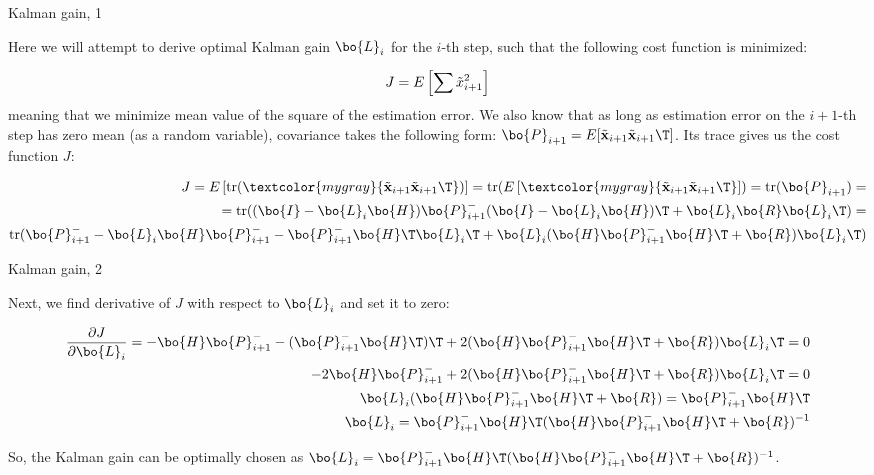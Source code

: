 \documentclass{beamer}
\newcommand{\btil}[1] {\Tilde{\mathbf{#1}}}
\begin{document}
\begin{frame}{Kalman gain, 1}
	\begin{flushleft}
		
		Here we will attempt to derive optimal Kalman gain $\bo{L}_i$ for the $i$-th step, such that the following cost function is minimized:
		
		\begin{equation}
			J = E \left[ \sum \Tilde x_{i+1}^2  \right]
		\end{equation}
		meaning that we minimize mean value of the square of the estimation error. We also know that as long as estimation error on the $i+1$-th step has zero mean (as a random variable), covariance takes the following form: $\bo{P}_{i+1} = E [ \btil{x}_{i+1} \btil{x}_{i+1}\T ]$. Its trace gives us the cost function $J$:
		
		
		
		\begin{align*}
			J = E \left[ \text{tr}(\textcolor{mygray}{
				\btil{x}_{i+1} \btil{x}_{i+1}\T})  \right] =
			\text{tr} (E \left[ \textcolor{mygray}{
				\btil{x}_{i+1} \btil{x}_{i+1}\T}  \right]) = 
				\text{tr} (\bo{P}_{i+1} ) =
				\\
			= \text{tr}(
			(\bo{I} - \bo{L}_i \bo{H}) \bo{P}_{i+1}^- (\bo{I} - \bo{L}_i \bo{H})\T +\bo{L}_i\bo{R}\bo{L}_i\T
			) = \\
			\text{tr}(
			\bo{P}_{i+1}^- - \bo{L}_i \bo{H} \bo{P}_{i+1}^- 
			- \bo{P}_{i+1}^- \bo{H}\T \bo{L}_i\T
			+ \bo{L}_i (\bo{H}\bo{P}_{i+1}^- \bo{H}\T + \bo{R}) \bo{L}_i\T
			)
		\end{align*}		
		
		
	\end{flushleft}
\end{frame}



\begin{frame}{Kalman gain, 2}
	\begin{flushleft}
		
		Next, we find derivative of $J$ with respect to $\bo{L}_i$ and set it to zero:
		
		\begin{align*}
			\frac{\partial J}{\partial \bo{L}_i} 
			= 
			-\bo{H} \bo{P}_{i+1}^- -(\bo{P}_{i+1}^- \bo{H}\T)\T + 
			2(\bo{H}\bo{P}_{i+1}^- \bo{H}\T + \bo{R}) \bo{L}_i\T = 0
			\\
			-2 \bo{H} \bo{P}_{i+1}^- + 2(\bo{H}\bo{P}_{i+1}^- \bo{H}\T + \bo{R}) \bo{L}_i\T = 0
			\\
			\bo{L}_i (\bo{H}\bo{P}_{i+1}^- \bo{H}\T + \bo{R}) = \bo{P}_{i+1}^- \bo{H}\T
			\\
			\bo{L}_i = \bo{P}_{i+1}^- \bo{H}\T (\bo{H}\bo{P}_{i+1}^- \bo{H}\T + \bo{R})^{-1}
		\end{align*}		
		
		
So, the Kalman gain can be optimally chosen as $\bo{L}_i = \bo{P}_{i+1}^- \bo{H}\T (\bo{H}\bo{P}_{i+1}^- \bo{H}\T + \bo{R})^{-1}$.
		
	\end{flushleft}
\end{frame}
\end{document}
